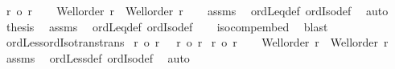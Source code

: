 \begin{isabellebody}
\ {\isachardoublequoteopen}r\ {\isasymle}o\ r{\isacharprime}{\kern0pt}{\isacharprime}{\kern0pt}{\isachardoublequoteclose}\isanewline
%
\isadelimproof
%
\endisadelimproof
%
\isatagproof
{}\isamarkupfalse%
{\isacharminus}{\kern0pt}\isanewline
\ \ \isamarkupfalse%
\ {\isachardoublequoteopen}Well{\isacharunderscore}{\kern0pt}order\ r\ {\isasymand}\ Well{\isacharunderscore}{\kern0pt}order\ r{\isacharprime}{\kern0pt}{\isacharprime}{\kern0pt}{\isachardoublequoteclose}\isanewline
\ \ \isamarkupfalse%
\ assms\ \isamarkupfalse%
\ ordLeq{\isacharunderscore}{\kern0pt}def\ ordIso{\isacharunderscore}{\kern0pt}def\ \isamarkupfalse%
\ auto\isanewline
\ \ \isamarkupfalse%
\ {\isacharquery}{\kern0pt}thesis\ \isamarkupfalse%
\ assms\ \isamarkupfalse%
\ ordLeq{\isacharunderscore}{\kern0pt}def\ ordIso{\isacharunderscore}{\kern0pt}def\isanewline
\ \ \isamarkupfalse%
\ iso{\isacharunderscore}{\kern0pt}comp{\isacharunderscore}{\kern0pt}embed\ \isamarkupfalse%
\ blast\isanewline
{}\isamarkupfalse%
%
\endisatagproof
{\isafoldproof}%
%
\isadelimproof
\isanewline
%
\endisadelimproof
\isanewline
{}\isamarkupfalse%
\ ordLess{\isacharunderscore}{\kern0pt}ordIso{\isacharunderscore}{\kern0pt}trans{\isacharbrackleft}{\kern0pt}trans{\isacharbrackright}{\kern0pt}{\isacharcolon}{\kern0pt}\isanewline
{}\ {\isachardoublequoteopen}r\ {\isacharless}{\kern0pt}o\ r{\isacharprime}{\kern0pt}{\isachardoublequoteclose}\ \ {\isachardoublequoteopen}\ r{\isacharprime}{\kern0pt}\ {\isacharequal}{\kern0pt}o\ r{\isacharprime}{\kern0pt}{\isacharprime}{\kern0pt}{\isachardoublequoteclose}\isanewline
{}\ {\isachardoublequoteopen}r\ {\isacharless}{\kern0pt}o\ r{\isacharprime}{\kern0pt}{\isacharprime}{\kern0pt}{\isachardoublequoteclose}\isanewline
%
\isadelimproof
%
\endisadelimproof
%
\isatagproof
{}\isamarkupfalse%
{\isacharminus}{\kern0pt}\isanewline
\ \ \isamarkupfalse%
\ {\isachardoublequoteopen}Well{\isacharunderscore}{\kern0pt}order\ r\ {\isasymand}\ Well{\isacharunderscore}{\kern0pt}order\ r{\isacharprime}{\kern0pt}{\isacharprime}{\kern0pt}{\isachardoublequoteclose}\isanewline
\ \ \isamarkupfalse%
\ assms\ \isamarkupfalse%
\ ordLess{\isacharunderscore}{\kern0pt}def\ ordIso{\isacharunderscore}{\kern0pt}def\ \isamarkupfalse%
\ auto\isanewline
\ \ \isamarkupfalse%

\end{isabellebody}

